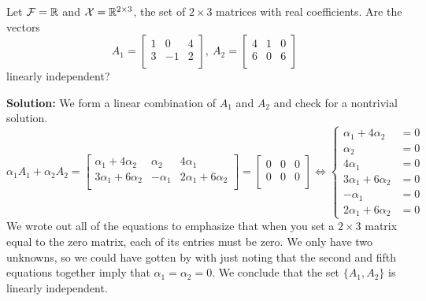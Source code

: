 \Qed

\vspace*{.2cm}

\begin{example} 
Let $\mathcal{F}=\mathbb R$ and $\mathcal{X}=\mathbb R^{2 \times 3}$, the set of $2 \times 3$ matrices with real coefficients. Are the vectors 
$$A_1=\left[ \begin{array}{rrr}
    1 & 0 & 4\\
    3 & -1 & 2\\
    \end{array}\right], ~A_2=\begin{bmatrix}
    4 & 1 & 0\\
    6 & 0 & 6\\
    \end{bmatrix}$$
    linearly independent? 
\end{example}

\textbf{Solution:}
We form a linear combination of $A_1$ and $A_2$ and check for a nontrivial solution. 
$$ \alpha_1 A_1 + \alpha_2 A_2 =  \begin{bmatrix}
    \alpha_1 + 4 \alpha_2 & \alpha_2 & 4 \alpha_1 \\
    3\alpha_1  + 6 \alpha_2 & - \alpha_1  & 2 \alpha_1 + 6 \alpha_2\\
    \end{bmatrix}  = \begin{bmatrix}
    0 & 0 & 0\\
    0 & 0 & 0\\
    \end{bmatrix} 
    \iff \left\{ \begin{array}{rl}
        \alpha_1 + 4 \alpha_2 & = 0\\
        \alpha_2 & = 0 \\
         4 \alpha_1 & = 0 \\
         3\alpha_1  + 6 \alpha_2 & = 0 \\
          - \alpha_1  & = 0 \\
           2 \alpha_1 + 6 \alpha_2 & = 0
    \end{array} \right.$$
    We wrote out all of the equations to emphasize that when you set a $2 \times 3$ matrix equal to the zero matrix, each of its entries must be zero. We only have two unknowns, so we could have gotten by with just noting that the second and fifth equations together imply that $\alpha_1 = \alpha_2 = 0$. We conclude that the set $\{A_1, A_2 \}$ is linearly independent. 
\Qed

\vspace*{.2cm}

